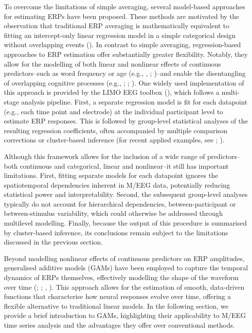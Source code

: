 \documentclass[
  doc,
  floatsintext,
  longtable,
  a4paper,
  nolmodern,
  notxfonts,
  notimes,
  donotrepeattitle,
  colorlinks=true,linkcolor=blue,citecolor=blue,urlcolor=blue]{apa7}
\begin{document}
To overcome the limitations of simple averaging, several model-based
approaches for estimating ERPs have been proposed. These methods are
motivated by the observation that traditional ERP averaging is
mathematically equivalent to fitting an intercept-only linear regression
model in a simple categorical design without overlapping events
(). In contrast to
simple averaging, regression-based approaches to ERP estimation offer
substantially greater flexibility. Notably, they allow for the modelling
of both linear and nonlinear effects of continuous predictors--such as
word frequency or age (e.g., , ;
)--and enable the
disentangling of overlapping cognitive processes (e.g.,
;
;
). One
widely used implementation of this approach is provided by the LIMO EEG
toolbox (), which follows
a multi-stage analysis pipeline. First, a separate regression model is
fit for each datapoint (e.g., each time point and electrode) at the
individual participant level to estimate ERP responses. This is followed
by group-level statistical analyses of the resulting regression
coefficients, often accompanied by multiple comparison corrections or
cluster-based inference (for recent applied examples, see
;
).

Although this framework allows for the inclusion of a wide range of
predictors--both continuous and categorical, linear and nonlinear--it
still has important limitations. First, fitting separate models for each
datapoint ignores the spatiotemporal dependencies inherent in M/EEG
data, potentially reducing statistical power and interpretability.
Second, the subsequent group-level analyses typically do not account for
hierarchical dependencies, between-participant or between-stimulus
variability, which could otherwise be addressed through multilevel
modelling. Finally, because the output of this procedure is summarised
by cluster-based inference, its conclusions remain subject to the
limitations discussed in the previous section.

Beyond modelling nonlinear effects of continuous predictors on ERP
amplitudes, generalised additive models (GAMs) have been employed to
capture the temporal dynamics of ERPs themselves, effectively modelling
the shape of the waveform over time
(;
;
,
). This approach allows for the
estimation of smooth, data-driven functions that characterise how neural
responses evolve over time, offering a flexible alternative to
traditional linear models. In the following section, we provide a brief
introduction to GAMs, highlighting their applicability to M/EEG time
series analysis and the advantages they offer over conventional methods.
\end{document}
